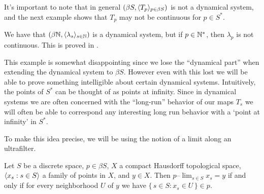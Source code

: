 It's important to note that in general $(\beta S, \langle T_p \rangle_{p
  \in \beta S})$ is not a dynamical system, and 
the next example shows that $T_p$ may not be continuous for $p \in S^*$.
 

  \begin{example}
    We have that $(\beta\mathbb{N}, \langle \lambda_s \rangle_{s\in\mathbb{N}})$ is a
    dynamical system, but if $p \in \mathbb{N}^*$, then $\lambda_p$ is not
    continuous.
    This is proved in \cite[Theorem 6.10 and Remark 6.11]{Hindman:1998fk}.
   \end{example}

This example is somewhat disappointing since we lose the ``dynamical
part'' when extending the dynamical system to $\beta S$.
However even with this lost we will be able to prove something
intelligible about certain dynamical systems. 
Intuitively, the points of $S^*$ can be thought of as points at
infinity. 
Since in dynamical systems we are often concerned with the
``long-run'' behavior of our maps $T_s$ we will often be able to
correspond any interesting long run behavior with a `point at infinity'
in $S^*$.

To make this idea precise, we will be using the notion of a limit
along an ultrafilter. 

  \begin{defn}
    \label{defn:plim}
    Let $S$ be a discrete space, $p \in \beta S$, $X$ a compact
    Hausdorff%
 topological space, $\langle x_s : s \in S \rangle$ a family
    of points in $X$, and $y \in X$.
    Then \hbox{$p$--$\displaystyle\lim_{s \in S} x_s = y$} if and only
    if for every
    neighborhood $U$ of $y$ we have $\{\, s \in S : x_s \in U \,\} \in p$.
  \end{defn}

